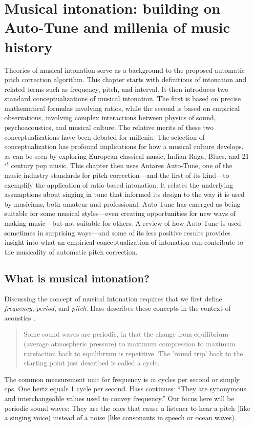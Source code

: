 \chapter{Musical intonation: building on Auto-Tune and millenia of music history}
\label{chap:intonation}
Theories of musical intonation serve as a background to the proposed automatic pitch correction algorithm. This chapter starts with definitions of intonation and related terms such as frequency, pitch, and interval. It then introduces two standard conceptualizations of musical intonation. The first is based on precise mathematical formulas involving ratios, while the second is based on empirical observations, involving complex interactions between physics of sound, psychoacoustics, and musical culture. The relative merits of these two conceptualizations have been debated for millenia. The selection of conceptualization has profound implications for how a musical culture develops, as can be seen by exploring European classical music, Indian Raga, Blues, and 21$^{st}$ century pop music. This chapter then uses Antares Auto-Tune, one of the music industry standards for pitch correction---and the first of its kind---to exemplify the application of ratio-based intonation. It relates the underlying assumptions about singing in tune that informed its design to the way it is used by musicians, both amateur and professional. Auto-Tune has emerged as being suitable for some musical styles---even creating opportunities for new ways of making music---but not suitable for others. A review of how Auto-Tune is used---sometimes in surprising ways---and some of its less positive results provides insight into what an empirical conceptualization of intonation can contribute to the musicality of automatic pitch correction.

\section{What is musical intonation?} 
Discussing the concept of musical intonation requires that we first define \textit{frequency}, \textit{period}, and \textit{pitch}. Hass describes these concepts in the context of acoustics \cite{hass2019introduction}. \begin{quotation}Some sound waves are periodic, in that the change from equilibrium (average atmospheric pressure) to maximum compression to maximum rarefaction back to equilibrium is repetitive. The 'round trip' back to the starting point just described is called a cycle.\end{quotation} The common measurement unit for frequency is in cycles per second or simply cps. One hertz equals 1 cycle per second. Hass continues: ``They are synonymous and interchangeable values used to convey frequency.'' \cite[][Ch.~1, Sec.~4--5]{hass2019introduction} Our focus here will be periodic sound waves: They are the ones that cause a listener to hear a pitch (like a singing voice) instead of a noise (like consonants in speech or ocean waves). %

